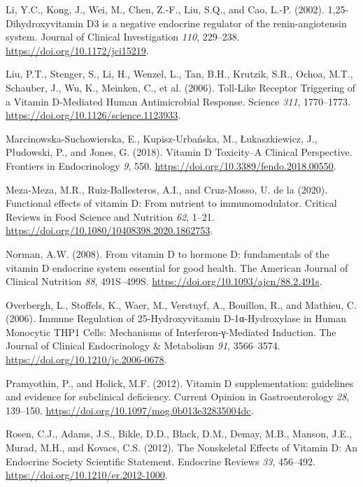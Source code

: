 \documentclass[
  a4paper,
  DIV=11,
  numbers=noendperiod,
  listof=totoc]{scrreprt}
\newlength{\cslhangindent}
\newlength{\cslentryspacingunit} %
\newenvironment{CSLReferences}[2] %
 {%
  \setlength{\parindent}{0pt}
  \ifodd #1
  \let\oldpar\par
  \def\par{\hangindent=\cslhangindent\oldpar}
  \fi
  \setlength{\parskip}{#2\cslentryspacingunit}
 }%
 {}
\begin{document}
\begin{CSLReferences}{0}{0}
\leavevmode{}%
Li, Y.C., Kong, J., Wei, M., Chen, Z.-F., Liu, S.Q., and Cao, L.-P.
(2002). {1,25-Dihydroxyvitamin D3 is a negative endocrine regulator of
the renin-angiotensin system}. Journal of Clinical Investigation
\emph{110}, 229--238. \url{https://doi.org/10.1172/jci15219}.

\leavevmode{}%
Liu, P.T., Stenger, S., Li, H., Wenzel, L., Tan, B.H., Krutzik, S.R.,
Ochoa, M.T., Schauber, J., Wu, K., Meinken, C., et al. (2006).
{Toll-Like Receptor Triggering of a Vitamin D-Mediated Human
Antimicrobial Response}. Science \emph{311}, 1770--1773.
\url{https://doi.org/10.1126/science.1123933}.

\leavevmode{}%
Marcinowska-Suchowierska, E., Kupisz-Urbańska, M., Łukaszkiewicz, J.,
Płudowski, P., and Jones, G. (2018). {Vitamin D Toxicity--A Clinical
Perspective}. Frontiers in Endocrinology \emph{9}, 550.
\url{https://doi.org/10.3389/fendo.2018.00550}.

\leavevmode{}%
Meza-Meza, M.R., Ruiz-Ballesteros, A.I., and Cruz-Mosso, U. de la
(2020). {Functional effects of vitamin D: From nutrient to
immunomodulator}. Critical Reviews in Food Science and Nutrition
\emph{62}, 1--21. \url{https://doi.org/10.1080/10408398.2020.1862753}.

\leavevmode{}%
Norman, A.W. (2008). {From vitamin D to hormone D: fundamentals of the
vitamin D endocrine system essential for good health}. The American
Journal of Clinical Nutrition \emph{88}, 491S--499S.
\url{https://doi.org/10.1093/ajcn/88.2.491s}.

\leavevmode{}%
Overbergh, L., Stoffels, K., Waer, M., Verstuyf, A., Bouillon, R., and
Mathieu, C. (2006). {Immune Regulation of 25-Hydroxyvitamin
D-1α-Hydroxylase in Human Monocytic THP1 Cells: Mechanisms of
Interferon-γ-Mediated Induction}. The Journal of Clinical Endocrinology
\& Metabolism \emph{91}, 3566--3574.
\url{https://doi.org/10.1210/jc.2006-0678}.

\leavevmode{}%
Pramyothin, P., and Holick, M.F. (2012). {Vitamin D supplementation:
guidelines and evidence for subclinical deficiency}. Current Opinion in
Gastroenterology \emph{28}, 139--150.
\url{https://doi.org/10.1097/mog.0b013e32835004dc}.

\leavevmode{}%
Rosen, C.J., Adams, J.S., Bikle, D.D., Black, D.M., Demay, M.B., Manson,
J.E., Murad, M.H., and Kovacs, C.S. (2012). {The Nonskeletal Effects of
Vitamin D: An Endocrine Society Scientific Statement}. Endocrine Reviews
\emph{33}, 456--492. \url{https://doi.org/10.1210/er.2012-1000}.


\end{CSLReferences}
\end{document}
